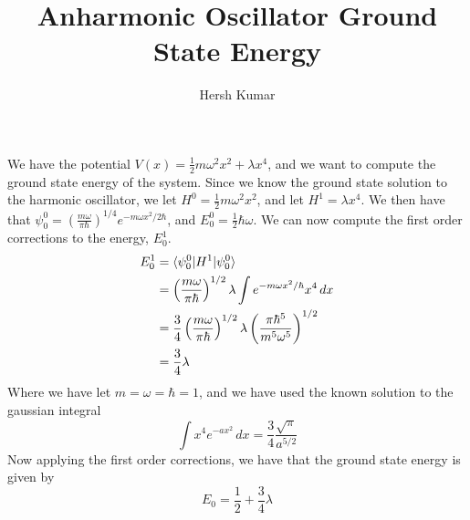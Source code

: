 \documentclass{notes}
\title{Anharmonic Oscillator Ground State Energy}
\author{Hersh Kumar}
\begin{document}
We have the potential $V(x) = \frac{1}{2}m\omega^2 x^2 + \lambda x^4$, and we want to compute the ground state energy of the system. Since we know the ground state solution to the harmonic oscillator, we let $H^0 = \frac{1}{2}m\omega^2 x^2$, and let $H^1 = \lambda x^4$. We then have that $\psi_0^0 = \left(\frac{m\omega}{\pi \hbar}\right)^{1/4} e^{-m\omega x^2/2\hbar}$, and $E_0^0 = \frac{1}{2}\hbar \omega$. We can now compute the first order corrections to the energy, $E_0^1$.
\begin{align*}
E_0^1 &= \braket{\psi_0^0 | H^1|\psi_0^0} \\ 
&= \left(\frac{m\omega}{\pi\hbar}\right)^{1/2}\lambda \int e^{-m\omega x^2/\hbar}x^4\,dx \\
&= \frac{3}{4}\left(\frac{m\omega}{\pi\hbar}\right)^{1/2}\lambda \left(\frac{\pi \hbar^5}{m^5\omega^5}\right)^{1/2}\\ 
&= \frac{3}{4}\lambda
\end{align*}
Where we have let $m = \omega = \hbar = 1$, and we have used the known solution to the gaussian integral
$$\int x^4 e^{-ax^2}\,dx = \frac{3}{4}\frac{\sqrt{\pi}}{a^{5/2}}$$
Now applying the first order corrections, we have that the ground state energy is given by
$$E_{0} = \frac{1}{2} + \frac{3}{4}\lambda$$
\end{document}
